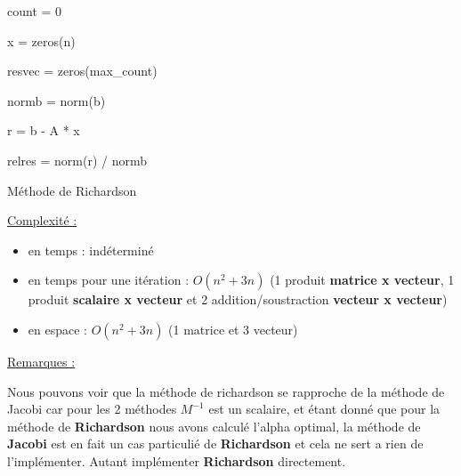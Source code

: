 \documentclass[11pt]{article}
\begin{document}
\begin{algorithm} [H]
  \SetAlgoLined

  count = 0 

  x = zeros(n) 

  resvec = zeros(max\_count) 

  normb = norm(b) 
  
  r = b - A * x 

  relres = norm(r) / normb 
  

  \caption{Méthode de Richardson}
\end{algorithm}

\vspace{5mm}

\underline{Complexité :}

\begin{itemize}
\item en temps : indéterminé
\item en temps pour une itération : $O(n^2 + 3n)$ (1 produit
  \textbf{matrice x vecteur}, 1 produit \textbf{scalaire x vecteur} et
  2 addition/soustraction \textbf{vecteur x vecteur})
\item en espace : $O(n^2 + 3n)$ (1 matrice et 3 vecteur)
\end{itemize}

\underline{Remarques :}\newline

\vspace{5mm}
Nous pouvons voir que la méthode de richardson se rapproche de la
méthode de Jacobi car pour les 2 méthodes $M^{-1}$ est un scalaire, et
étant donné que pour la méthode de \textbf{Richardson} nous avons calculé
l'alpha optimal, la méthode de \textbf{Jacobi} est en fait un cas
particulié de \textbf{Richardson} et cela ne sert a rien de
l'implémenter. Autant implémenter \textbf{Richardson} directement.
\end{document}
